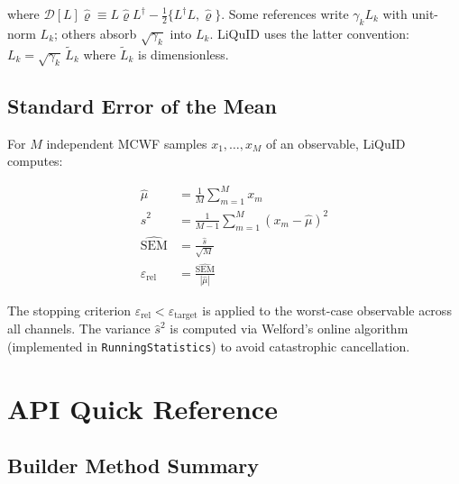 \documentclass[11pt,a4paper,twoside]{book}
\newcommand{\densmat}{\hat{\varrho}}    %
\newcommand{\code}[1]{\texttt{\small#1}}
\theoremstyle{definition}
\theoremstyle{remark}
\begin{document}
where $\mathcal{D}[L]\densmat \equiv L\densmat L^\dagger - \tfrac{1}{2}\{L^\dagger L, \densmat\}$.
Some references write $\gamma_k L_k$ with unit-norm $L_k$; others absorb
$\sqrt{\gamma_k}$ into $L_k$. LiQuID uses the latter convention:
$L_k = \sqrt{\gamma_k}\,\tilde{L}_k$ where $\tilde{L}_k$ is dimensionless.

\section{Standard Error of the Mean}
\label{app:sem}

For $M$ independent MCWF samples $x_1, \ldots, x_M$ of an observable,
LiQuID computes:

\begin{align}
  \hat{\mu}   &= \frac{1}{M}\sum_{m=1}^M x_m \\
  \hat{s}^2   &= \frac{1}{M-1}\sum_{m=1}^M (x_m - \hat{\mu})^2 \\
  \widehat{\mathrm{SEM}} &= \frac{\hat{s}}{\sqrt{M}} \\
  \varepsilon_{\mathrm{rel}} &= \frac{\widehat{\mathrm{SEM}}}{|\hat{\mu}|}
\end{align}

The stopping criterion $\varepsilon_{\mathrm{rel}} < \varepsilon_{\mathrm{target}}$
is applied to the worst-case observable across all channels.
The variance $\hat{s}^2$ is computed via Welford's online algorithm
(implemented in \code{RunningStatistics}) to avoid catastrophic cancellation.

\chapter{API Quick Reference}
\label{app:api-ref}

\section{Builder Method Summary}
\label{app:builder-summary}
\end{document}
